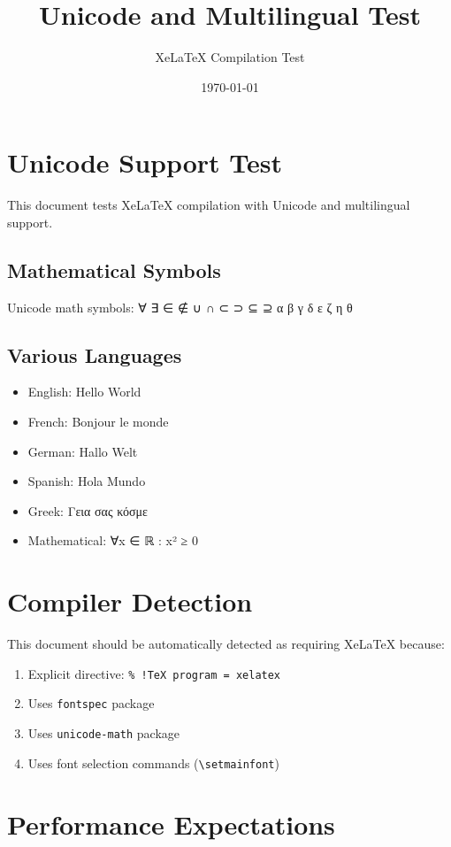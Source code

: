 \documentclass{article}
\title{Unicode and Multilingual Test}
\author{XeLaTeX Compilation Test}
\date{\today}
\begin{document}
\maketitle

\section{Unicode Support Test}

This document tests XeLaTeX compilation with Unicode and multilingual support.

\subsection{Mathematical Symbols}
Unicode math symbols: ∀ ∃ ∈ ∉ ∪ ∩ ⊂ ⊃ ⊆ ⊇ α β γ δ ε ζ η θ

\subsection{Various Languages}
\begin{itemize}
    \item English: Hello World
    \item French: Bonjour le monde  
    \item German: Hallo Welt
    \item Spanish: Hola Mundo
    \item Greek: Γεια σας κόσμε
    \item Mathematical: ∀x ∈ ℝ : x² ≥ 0
\end{itemize}

\section{Compiler Detection}

This document should be automatically detected as requiring XeLaTeX because:
\begin{enumerate}
    \item Explicit directive: \texttt{\% !TeX program = xelatex}
    \item Uses \texttt{fontspec} package
    \item Uses \texttt{unicode-math} package  
    \item Uses font selection commands (\texttt{\textbackslash setmainfont})
\end{enumerate}

\section{Performance Expectations}
\end{document}
